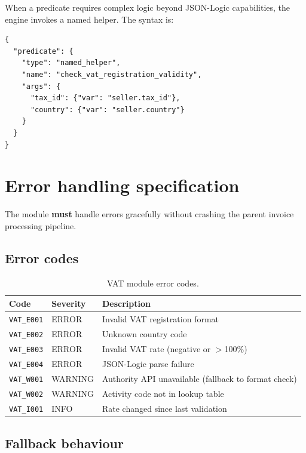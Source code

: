 \documentclass[11pt,a4paper,twoside]{report}
\begin{document}
When a predicate requires complex logic beyond JSON-Logic capabilities,
the engine invokes a named helper. The syntax is:

\begin{lstlisting}[basicstyle=\ttfamily\small,caption={Named helper invocation in rule predicate.}]
{
  "predicate": {
    "type": "named_helper",
    "name": "check_vat_registration_validity",
    "args": {
      "tax_id": {"var": "seller.tax_id"},
      "country": {"var": "seller.country"}
    }
  }
}
\end{lstlisting}

\section{Error handling specification}

The module \textbf{must} handle errors gracefully without crashing the
parent invoice processing pipeline.

\subsection{Error codes}

\begin{table}[htbp]
\centering
\caption{VAT module error codes.}
\label{tab:vat-errors}
\footnotesize
\begin{tabularx}{\linewidth}{@{}l l X@{}}
\toprule
\textbf{Code} & \textbf{Severity} & \textbf{Description} \\ \midrule
\texttt{VAT\_E001} & ERROR & Invalid VAT registration format \\
\texttt{VAT\_E002} & ERROR & Unknown country code \\
\texttt{VAT\_E003} & ERROR & Invalid VAT rate (negative or $>$100\%) \\
\texttt{VAT\_E004} & ERROR & JSON-Logic parse failure \\
\texttt{VAT\_W001} & WARNING & Authority API unavailable (fallback to format check) \\
\texttt{VAT\_W002} & WARNING & Activity code not in lookup table \\
\texttt{VAT\_I001} & INFO & Rate changed since last validation \\
\bottomrule
\end{tabularx}
\end{table}

\subsection{Fallback behaviour}
\end{document}
